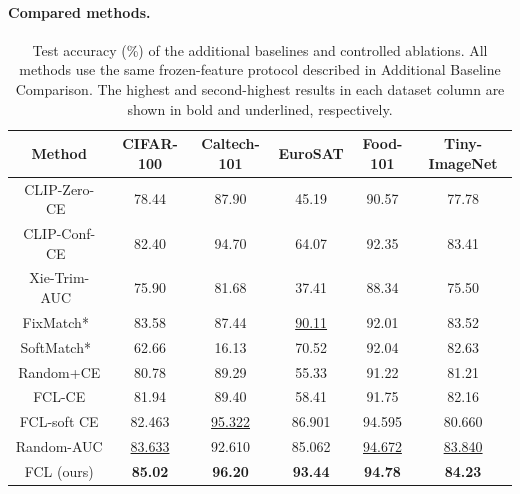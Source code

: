 \documentclass[10pt,twocolumn,letterpaper]{article}
\begin{document}
\paragraph{Compared methods.}

\begin{table}[t]
\caption{Test accuracy (\%) of the additional baselines and controlled
ablations. All methods use the same frozen-feature protocol described in
Additional Baseline Comparison. The highest and second-highest results in
each dataset column are shown in bold and underlined, respectively.}
\label{tab:supp-additional-baselines}
\centering
\small
\setlength{\tabcolsep}{4pt}
\begin{tabular*}{\textwidth}{@{\extracolsep{\fill}}cccccc}
\toprule
Method & \textbf{CIFAR-100} & \textbf{Caltech-101} & \textbf{EuroSAT} & \textbf{Food-101} & \textbf{Tiny-ImageNet} \\
\midrule
CLIP-Zero-CE~\cite{radford2021clip} & 78.44 & 87.90 & 45.19 & 90.57 & 77.78 \\
CLIP-Conf-CE~\cite{radford2021clip} & 82.40 & 94.70 & 64.07 & 92.35 & 83.41 \\
Xie-Trim-AUC~\cite{xie2024wsauc} & 75.90 & 81.68 & 37.41 & 88.34 & 75.50 \\
FixMatch*~\cite{sohn2020fixmatch} & 83.58 & 87.44 & \underline{90.11} & 92.01 & 83.52 \\
SoftMatch*~\cite{chen2023softmatch} & 62.66 & 16.13 & 70.52 & 92.04 & 82.63 \\
Random+CE & 80.78 & 89.29 & 55.33 & 91.22 & 81.21 \\
FCL-CE & 81.94 & 89.40 & 58.41 & 91.75 & 82.16 \\
FCL-soft CE & 82.463 & \underline{95.322} & 86.901 & 94.595 & 80.660 \\
Random-AUC & \underline{83.633} & 92.610 & 85.062 & \underline{94.672} & \underline{83.840} \\
FCL (ours) & \textbf{85.02} & \textbf{96.20} & \textbf{93.44} & \textbf{94.78} & \textbf{84.23} \\
\bottomrule
\end{tabular*}

\end{table}
\end{document}
